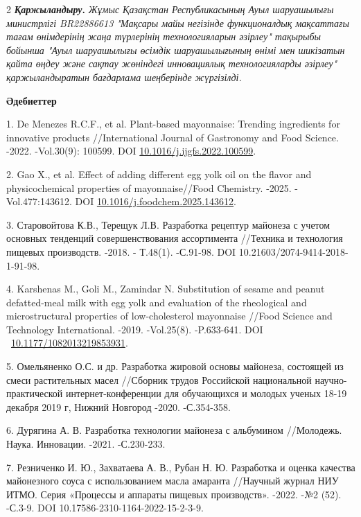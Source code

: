 \begin{multicols}{2}
{\bfseries \emph{Қаржыландыру}.} \emph{Жұмыс Қазақстан Республикасының Ауыл
шаруашылығы министрлігі BR22886613 "Мақсары майы негізінде функционалдық
мақсаттағы тағам өнімдерінің жаңа түрлерінің технологияларын әзірлеу"
тақырыбы бойынша "Ауыл шаруашылығы өсімдік шаруашылығының өнімі мен
шикізатын қайта өңдеу және сақтау жөніндегі инновациялық технологияларды
әзірлеу" қаржыландыратын бағдарлама шеңберінде жүргізілді.}
\end{multicols}

\begin{center}
{\bfseries Әдебиеттер}
\end{center}

\begin{refs}
1. De Menezes R.C.F., et al. Plant-based mayonnaise: Trending ingredients
for innovative products //International Journal of Gastronomy and Food
Science. -2022. -Vol.30(9): 100599. DOI
\href{https://doi.org/10.1016/j.ijgfs.2022.100599}{10.1016/j.ijgfs.2022.100599}.

2. Gao X., et al. Effect of adding different egg yolk oil on the flavor
and physicochemical properties of mayonnaise//Food Chemistry. -2025.
-Vol.477:143612. DOI
\href{https://doi.org/10.1016/j.foodchem.2025.143612}{10.1016/j.foodchem.2025.143612}.

3. Старовойтова К.В., Терещук Л.В. Разработка рецептур майонеза с учетом
основных тенденций совершенствования ассортимента //Техника и
технология пищевых производств. -2018. - Т.48(1). -С.91-98. DOI
10.21603/2074-9414-2018-1-91-98.

4. Karshenas M., Goli M., Zamindar N. Substitution of sesame and peanut
defatted-meal milk with egg yolk and evaluation of the rheological and
microstructural properties of low-cholesterol mayonnaise //Food
Science and Technology International. -2019. -Vol.25(8). -P.633-641.
DOI
~\href{https://doi.org/10.1177/1082013219853931}{10.1177/1082013219853931}.

5. Омельяненко О.С. и др. Разработка жировой основы майонеза, состоящей
из смеси растительных масел //Сборник трудов Российской национальной
научно-практической интернет-конференции для обучающихся и молодых
ученых 18-19 декабря 2019 г, Нижний Новгород -2020. -С.354-358.

6. Дурягина А. В. Разработка технологии майонеза с альбумином //Молодежь.
Наука. Инновации. -2021. -С.230-233.

7. Резниченко И. Ю., Захватаева А. В., Рубан Н. Ю. Разработка и оценка
качества майонезного соуса с использованием масла амаранта //Научный
журнал НИУ ИТМО. Серия «Процессы и аппараты пищевых производств».
-2022. -№2 (52). -С.3-9. DOI 10.17586-2310-1164-2022-15-2-3-9.


\end{refs}
